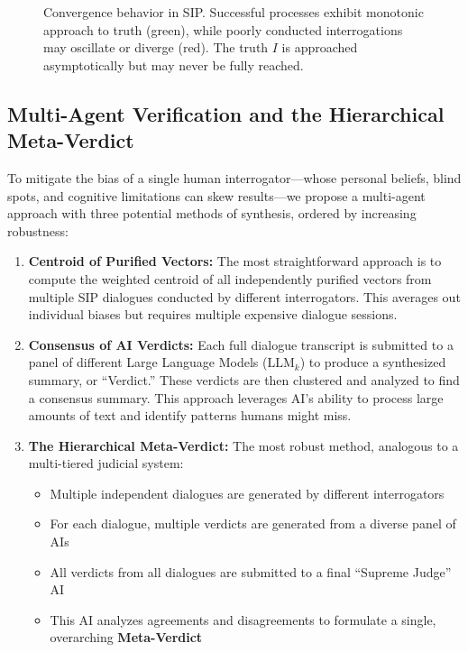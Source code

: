 \documentclass[11pt,a4paper]{article}
\begin{document}
\begin{small}
\begin{figure}[ht]
\begin{tikzpicture}[scale=1.3]
\end{tikzpicture}
\caption{Convergence behavior in SIP. Successful processes exhibit monotonic approach to truth (green), while poorly conducted interrogations may oscillate or diverge (red). The truth $I$ is approached asymptotically but may never be fully reached.}
\label{fig:convergence}
\end{figure}

\subsection{Multi-Agent Verification and the Hierarchical Meta-Verdict}

To mitigate the bias of a single human interrogator---whose personal beliefs, blind spots, and cognitive limitations can skew results---we propose a multi-agent approach with three potential methods of synthesis, ordered by increasing robustness:

\begin{enumerate}[leftmargin=*]
    \item \textbf{Centroid of Purified Vectors:} The most straightforward approach is to compute the weighted centroid of all independently purified vectors from multiple SIP dialogues conducted by different interrogators. This averages out individual biases but requires multiple expensive dialogue sessions.
    
    \item \textbf{Consensus of AI Verdicts:} Each full dialogue transcript is submitted to a panel of different Large Language Models ($\text{LLM}_k$) to produce a synthesized summary, or ``Verdict.'' These verdicts are then clustered and analyzed to find a consensus summary. This approach leverages AI's ability to process large amounts of text and identify patterns humans might miss.
    
    \item \textbf{The Hierarchical Meta-Verdict:} The most robust method, analogous to a multi-tiered judicial system:
    \begin{itemize}[nosep]
        \item Multiple independent dialogues are generated by different interrogators
        \item For each dialogue, multiple verdicts are generated from a diverse panel of AIs
        \item All verdicts from all dialogues are submitted to a final ``Supreme Judge'' AI
        \item This AI analyzes agreements and disagreements to formulate a single, overarching \textbf{Meta-Verdict}
    \end{itemize}
\end{enumerate}


\end{small}
\end{document}
